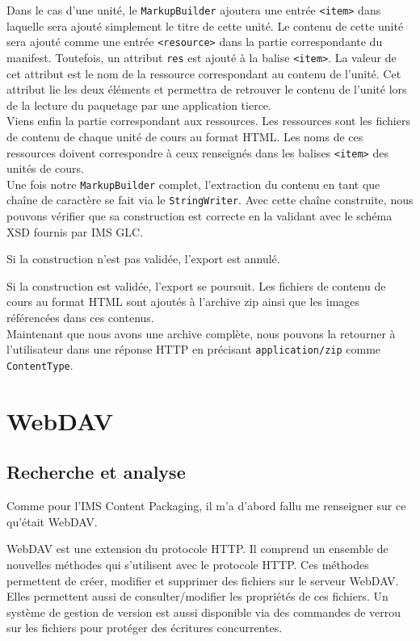 Dans le cas d'une unité, le {\tt MarkupBuilder} ajoutera une entrée {\tt <item>}
dans laquelle sera ajouté simplement le titre de cette unité. Le contenu de
cette unité sera ajouté comme une entrée {\tt <resource>} dans la partie
correspondante du manifest. Toutefois, un attribut {\tt res} est ajouté à la
balise {\tt <item>}. La valeur de cet attribut est le nom de la ressource
correspondant au contenu de l'unité. Cet attribut lie les deux éléments et
permettra de retrouver le contenu de l'unité lors de la lecture du paquetage par
une application tierce.\\

Viens enfin la partie correspondant aux ressources. Les ressources sont les
fichiers de contenu de chaque unité de cours au format HTML. Les noms de ces
ressources doivent correspondre à ceux renseignés dans les balises {\tt <item>}
des unités de cours.\\

Une fois notre {\tt MarkupBuilder} complet, l'extraction du contenu en tant que
chaîne de caractère se fait via le {\tt StringWriter}. Avec cette chaîne
construite, nous pouvons vérifier que sa construction est correcte en la
validant avec le schéma XSD fournis par IMS GLC.

Si la construction n'est pas validée, l'export est annulé.

Si la construction est validée, l'export se poursuit. Les fichiers de contenu de
cours au format HTML sont ajoutés à l'archive zip ainsi que les images
référencées dans ces contenus.\\

Maintenant que nous avons une archive complète, nous pouvons la retourner à
l'utilisateur dans une réponse HTTP en précisant {\tt application/zip} comme
{\tt ContentType}.

\section{WebDAV}
\subsection{Recherche et analyse}
Comme pour l'IMS Content Packaging, il m'a d'abord fallu me renseigner sur ce
qu'était WebDAV.

WebDAV est une extension du protocole HTTP. Il comprend un ensemble de nouvelles
méthodes qui s'utilisent avec le protocole HTTP. Ces méthodes permettent de
créer, modifier et supprimer des fichiers sur le serveur WebDAV. Elles
permettent aussi de consulter/modifier les propriétés de ces fichiers. Un
système de gestion de version est aussi disponible via des commandes de verrou
sur les fichiers pour protéger des écritures concurrentes.

